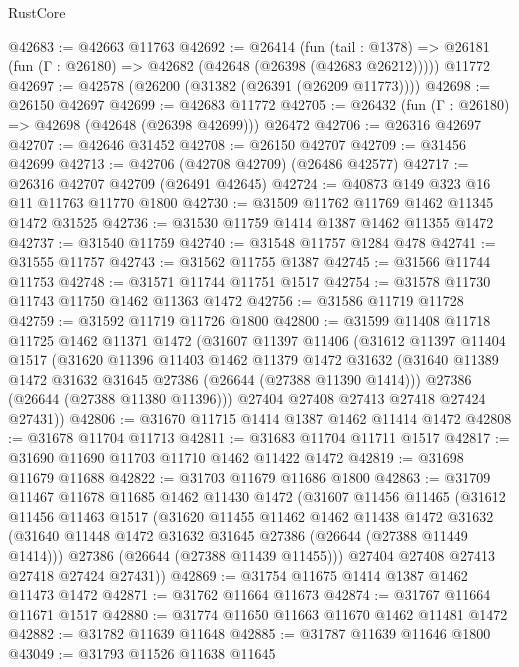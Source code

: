 \begin{lexlean}{RustCore}
\begin{coremodule}
@42683 := @42663 @11763
@42692 := @26414
    (fun (tail : @1378) => @26181 (fun (Γ : @26180) => @42682 (@42648 (@26398 (@42683 @26212)))))
    @11772
@42697 := @42578 (@26200 (@31382 (@26391 (@26209 @11773))))
@42698 := @26150 @42697
@42699 := @42683 @11772
@42705 := @26432 (fun (Γ : @26180) => @42698 (@42648 (@26398 @42699))) @26472
@42706 := @26316 @42697
@42707 := @42646 @31452
@42708 := @26150 @42707
@42709 := @31456 @42699
@42713 := @42706 (@42708 @42709) (@26486 @42577)
@42717 := @26316 @42707 @42709 (@26491 @42645)
@42724 := @40873 @149 @323 @16 @11 @11763 @11770 @1800
@42730 := @31509 @11762 @11769 @1462 @11345 @1472 @31525
@42736 := @31530 @11759 @1414 @1387 @1462 @11355 @1472
@42737 := @31540 @11759
@42740 := @31548 @11757 @1284 @478
@42741 := @31555 @11757
@42743 := @31562 @11755 @1387
@42745 := @31566 @11744 @11753
@42748 := @31571 @11744 @11751 @1517
@42754 := @31578 @11730 @11743 @11750 @1462 @11363 @1472
@42756 := @31586 @11719 @11728
@42759 := @31592 @11719 @11726 @1800
@42800 := @31599
    @11408
    @11718
    @11725
    @1462
    @11371
    @1472
    (@31607
      @11397
      @11406
      (@31612
        @11397
        @11404
        @1517
        (@31620
          @11396
          @11403
          @1462
          @11379
          @1472
          @31632
          (@31640 @11389 @1472 @31632 @31645 @27386 (@26644 (@27388 @11390 @1414)))
          @27386
          (@26644 (@27388 @11380 @11396)))
        @27404
        @27408
        @27413
        @27418
        @27424
        @27431))
@42806 := @31670 @11715 @1414 @1387 @1462 @11414 @1472
@42808 := @31678 @11704 @11713
@42811 := @31683 @11704 @11711 @1517
@42817 := @31690 @11690 @11703 @11710 @1462 @11422 @1472
@42819 := @31698 @11679 @11688
@42822 := @31703 @11679 @11686 @1800
@42863 := @31709
    @11467
    @11678
    @11685
    @1462
    @11430
    @1472
    (@31607
      @11456
      @11465
      (@31612
        @11456
        @11463
        @1517
        (@31620
          @11455
          @11462
          @1462
          @11438
          @1472
          @31632
          (@31640 @11448 @1472 @31632 @31645 @27386 (@26644 (@27388 @11449 @1414)))
          @27386
          (@26644 (@27388 @11439 @11455)))
        @27404
        @27408
        @27413
        @27418
        @27424
        @27431))
@42869 := @31754 @11675 @1414 @1387 @1462 @11473 @1472
@42871 := @31762 @11664 @11673
@42874 := @31767 @11664 @11671 @1517
@42880 := @31774 @11650 @11663 @11670 @1462 @11481 @1472
@42882 := @31782 @11639 @11648
@42885 := @31787 @11639 @11646 @1800
@43049 := @31793
    @11526
    @11638
    @11645

\end{coremodule}
\end{lexlean}
